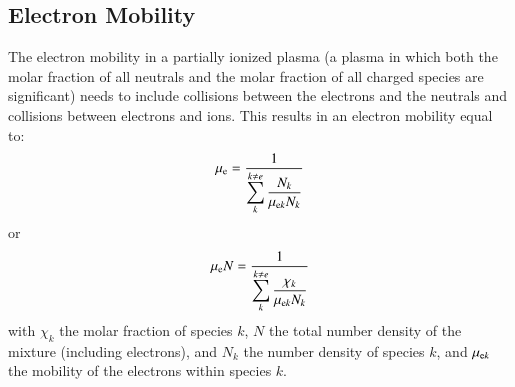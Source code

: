 \documentclass{warpdoc}
\newcommand{\mfd}{\displaystyle}
\begin{document}
\subsection{Electron Mobility}

The electron mobility in a partially ionized plasma (a plasma in which both the molar fraction of all neutrals and the molar fraction of all charged species are significant) needs to include collisions between the electrons and the neutrals and collisions between electrons and ions. This results in an electron mobility equal to:
%
\begin{equation}
\mu_{\rm e}=\frac{1}{\mfd \sum_k^{k\ne e} \frac{N_k}{\mu_{{\rm e}k}N_k}}
\end{equation}
%
or
%
\begin{equation}
\mu_{\rm e} N=\frac{1}{\mfd \sum_k^{k\ne e} \frac{\chi_k}{\mu_{{\rm e}k}N_k}}
\end{equation}
%
with $\chi_k$ the molar fraction of species $k$, $N$ the total number density of the mixture (including electrons), and $N_k$ the number density of species $k$, and $\mu_{{\rm e}k}$ the mobility of the electrons within species $k$. 
\end{document}
